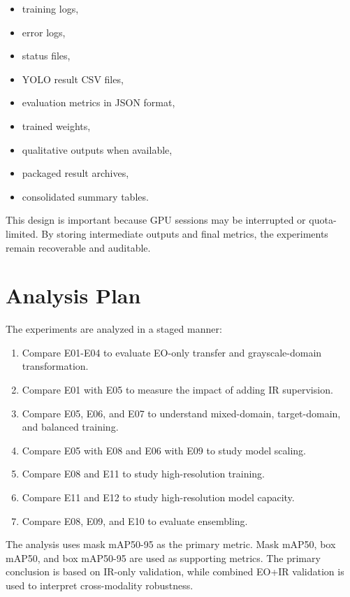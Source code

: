 \begin{itemize}
    \item training logs,
    \item error logs,
    \item status files,
    \item YOLO result CSV files,
    \item evaluation metrics in JSON format,
    \item trained weights,
    \item qualitative outputs when available,
    \item packaged result archives,
    \item consolidated summary tables.
\end{itemize}

This design is important because GPU sessions may be interrupted or quota-limited. By storing intermediate outputs and final metrics, the experiments remain recoverable and auditable.

\section{Analysis Plan}

The experiments are analyzed in a staged manner:

\begin{enumerate}
    \item Compare E01-E04 to evaluate EO-only transfer and grayscale-domain transformation.
    \item Compare E01 with E05 to measure the impact of adding IR supervision.
    \item Compare E05, E06, and E07 to understand mixed-domain, target-domain, and balanced training.
    \item Compare E05 with E08 and E06 with E09 to study model scaling.
    \item Compare E08 and E11 to study high-resolution training.
    \item Compare E11 and E12 to study high-resolution model capacity.
    \item Compare E08, E09, and E10 to evaluate ensembling.
\end{enumerate}

The analysis uses mask mAP50-95 as the primary metric. Mask mAP50, box mAP50, and box mAP50-95 are used as supporting metrics. The primary conclusion is based on IR-only validation, while combined EO+IR validation is used to interpret cross-modality robustness.

